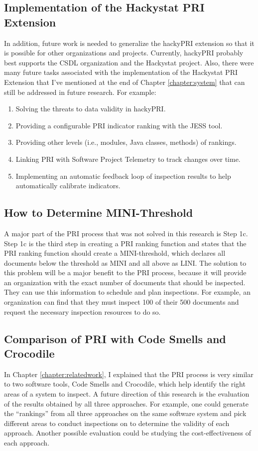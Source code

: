 \subsection{Implementation of the Hackystat PRI Extension}
In addition, future work is needed to generalize the hackyPRI extension so
that it is possible for other organizations and projects. Currently,
hackyPRI probably best supports the CSDL organization and the Hackystat
project. Also, there were many future tasks associated with the
implementation of the Hackystat PRI Extension that I've mentioned at the
end of Chapter \ref{chapter:system} that can still be addressed in future
research. For example: 

\begin{enumerate}
\item Solving the threats to data validity in hackyPRI.
\item Providing a configurable PRI indicator ranking with the JESS tool.
\item Providing other levels (i.e., modules, Java classes, methods) of
  rankings. 
\item Linking PRI with Software Project Telemetry to track changes over
  time.
\item Implementing an automatic feedback loop of inspection results to help
  automatically calibrate indicators.
\end{enumerate}

\subsection{How to Determine MINI-Threshold}
A major part of the PRI process that was not solved in this research is
Step 1c. Step 1c is the third step in creating a PRI ranking function and
states that the PRI ranking function should create a MINI-threshold, which
declares all documents below the threshold as MINI and all above as LINI.
The solution to this problem will be a major benefit to the PRI process,
because it will provide an organization with the exact number of documents
that should be inspected. They can use this information to schedule and
plan inspections. For example, an organization can find that they must
inspect 100 of their 500 documents and request the necessary inspection
resources to do so.


\subsection{Comparison of PRI with Code Smells and Crocodile}
In Chapter \ref{chapter:relatedwork}, I explained that the PRI process is
very similar to two software tools, Code Smells and Crocodile, which help
identify the right areas of a system to inspect. A future direction of
this research is the evaluation of the results obtained by all three
approaches. For example, one could generate the ``rankings'' from all three 
approaches on the same software system and pick different areas to conduct 
inspections on to determine the validity of each approach. Another possible 
evaluation could be studying the cost-effectiveness of each approach. 

